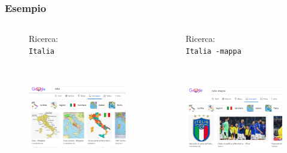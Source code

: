 \documentclass[handout]{beamer}
\begin{document}
\begin{frame}
\frametitle{Esempio}
\begin{columns}
\begin{column}{.5\textwidth}
  \begin{figure}
    Ricerca:\\\texttt{Italia}

    ~

    \includegraphics[width=\columnwidth]{img/italia.png}
  \end{figure}
\end{column}
\begin{column}{.5\textwidth}
  \begin{figure}
    Ricerca:\\\texttt{Italia -mappa}
    
    ~

    \includegraphics[width=\columnwidth]{img/italia2.png}
  \end{figure}
\end{column}
\end{columns}
\end{frame}
\end{document}
